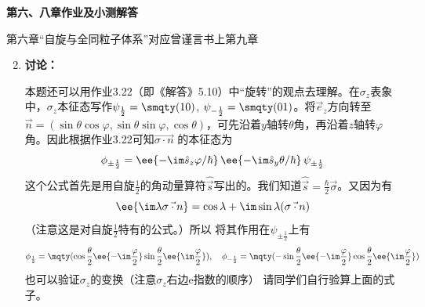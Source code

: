 \begin{center}
    \Large{\textbf{第六、八章作业及小测解答}}
\end{center}

第六章“自旋与全同粒子体系”对应曾谨言书上第九章
\begin{enumerate}[label=\textbf{6.\arabic*}, listparindent=\parindent]

\setcounter{enumi}{1}
\item
{\color{red}\textbf{讨论：}}

本题还可以用作业3.22（即《解答》5.10）中“旋转”的观点去理解。在$\sigma_z$表象中，$\sigma_z$本征态写作$\psi_{\frac{1}{2}}=\smqty(1\\0)$, $\psi_{-\frac{1}{2}}=\smqty(0\\1)$。将$\vec{e}_z$方向转至$\vec{n}=(\sin\theta\cos\varphi,\sin\theta\sin\varphi,\cos\theta)$，可先沿着$y$轴转$\theta$角，再沿着$z$轴转$\varphi$角。因此根据作业3.22可知$\vec{\sigma\cdot n}$
的本征态为
\[\phi_{\pm\frac{1}{2}}=\ee{-\im\hat{s}_z\varphi/\hbar}\,\ee{-\im\hat{s}_y\theta/\hbar}\,\psi_{\pm\frac{1}{2}}\]
这个公式首先是用自旋$\frac{1}{2}$的角动量算符$\hat{\vec{s}}$写出的。我们知道$\hat{\vec{s}}=\frac{\hbar}{2}\vec{\sigma}$。又因为有
\[\ee{\im\lambda\vec{\sigma\cdot n}} =\cos\lambda + \im\sin\lambda(\vec{\sigma\cdot n})\]
（注意这是对自旋$\frac{1}{2}$特有的公式。）所以
将其作用在$\psi_{\pm\frac{1}{2}}$上有
\[\phi_{\frac{1}{2}}=\mqty(\cos\frac{\theta}{2}\ee{-\im\frac{\varphi}{2}} \\ \sin\frac{\theta}{2}\ee{\im\frac{\varphi}{2}}),\quad \phi_{-\frac{1}{2}}=\mqty(-\sin\frac{\theta}{2}\ee{-\im\frac{\varphi}{2}}\\\cos\frac{\theta}{2}\ee{\im\frac{\varphi}{2}})\]
也可以验证$\sigma_z$的变换（注意$\sigma_z$右边e指数的顺序）
请同学们自行验算上面的式子。


\end{enumerate}
